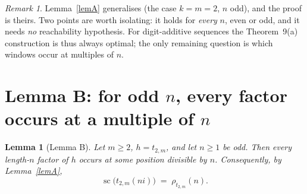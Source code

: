 \documentclass[10pt,reqno]{amsart}
\theoremstyle{plain}
\newtheorem{lemma}[theorem]{Lemma}
\theoremstyle{definition}
\theoremstyle{remark}
\newtheorem{remark}[theorem]{Remark}
\numberwithin{theorem}{section}
\DeclareMathOperator{\sco}{sc}
\newcommand{\tm}{t_{2,m}}
\begin{document}
\begin{remark}
Lemma~\ref{lemA} generalises \cite[Thm.~16]{MRS} (the case $k = m = 2$, $n$ odd), and the
proof is theirs. Two points are worth isolating: it holds for \emph{every} $n$, even or odd,
and it needs \emph{no} reachability hypothesis. For digit-additive sequences the
Theorem~9(a) construction is thus always optimal; the only remaining question is which
windows occur at multiples of $n$.
\end{remark}

\section{Lemma B: for odd $n$, every factor occurs at a multiple of $n$}
\label{sec:lemB}

\begin{lemma}[Lemma B]
\label{lemB}
Let $m \ge 2$, $h = \tm$, and let $n \ge 1$ be odd. Then every length-$n$ factor of $h$
occurs at some position divisible by $n$. Consequently, by Lemma~\ref{lemA},
\[
  \sco\bigl(\tm(ni)\bigr) \;=\; \rho_{\tm}(n) .
\]
\end{lemma}
\end{document}
